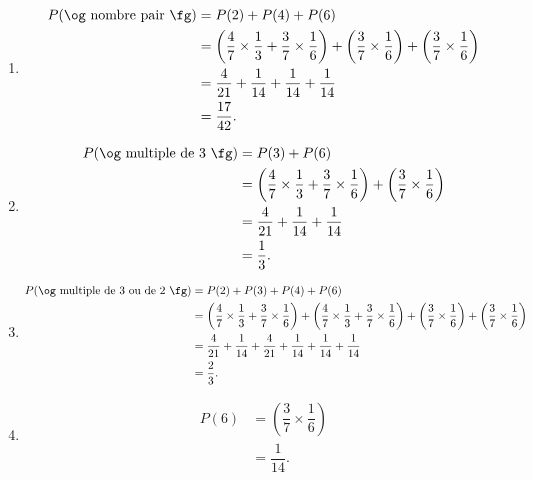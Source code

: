 {\begin{center}
	\end{center}
	
	\begin{enumerate}
		\item
			\begin{align*}
				P(\text{\og nombre pair \fg}) &= P(2) + P(4) + P(6) \\
					&= \left( \dfrac47 \times \dfrac13 + \dfrac37\times\dfrac16 \right) + \left( \dfrac37 \times \dfrac16 \right) + \left( \dfrac37 \times \dfrac16 \right) \\
					&= \dfrac4{21} + \dfrac1{14} + \dfrac1{14} + \dfrac1{14} \\
					&= \dfrac{17}{42}.
			\end{align*}
		\item
			\begin{align*}
				P(\text{\og multiple de $3$ \fg}) &= P(3) + P(6) \\
					&= \left( \dfrac47 \times \dfrac13 + \dfrac37\times\dfrac16 \right) + \left( \dfrac37 \times \dfrac16 \right) \\
					&= \dfrac4{21} + \dfrac1{14} + \dfrac1{14} \\
					&= \dfrac13.
			\end{align*}
		\item
			\begin{align*}
				P(\text{\og multiple de $3$ ou de $2$ \fg}) &= P(2) + P(3) + P(4) + P(6) \\
					&= \left( \dfrac47 \times \dfrac13 + \dfrac37\times\dfrac16 \right) + \left( \dfrac47 \times \dfrac13 + \dfrac37\times\dfrac16 \right) + \left( \dfrac37 \times \dfrac16 \right) + \left( \dfrac37 \times \dfrac16 \right) \\
					&= \dfrac4{21} + \dfrac1{14} + \dfrac4{21} + \dfrac1{14} + \dfrac1{14} + \dfrac1{14} \\
					&= \dfrac23.
			\end{align*}
		\item 
			\begin{align*}
				P(6) &=\left( \dfrac37 \times \dfrac16 \right) \\
					&= \dfrac1{14}.
			\end{align*}
			

\end{enumerate}}
